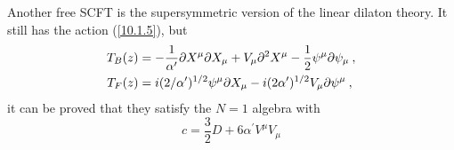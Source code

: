 Another free SCFT is the supersymmetric version of the linear dilaton theory. It still has the action (\ref{10.1.5}), but
\begin{subequations}
	\begin{align}
		T_{B}(z)&=-\frac{1}{\alpha^{\prime}} \partial X^{\mu}\partial X_{\mu} +V_{\mu}\partial^{2}X^{\mu} -\frac{1}{2}\psi^{\mu}\partial\psi_{\mu} \:,\label{10.1.22a} \\
		T_{F}(z)&= i(2/\alpha^{\prime})^{1/2}\psi^{\mu}\partial X_{\mu}-i (2\alpha^{\prime})^{1/2}V_{\mu}\partial\psi^{\mu} \:, \label{10.1.22b} 
	\end{align} \label{10.1.22}
\end{subequations}
it can be proved that they satisfy the $N=1$ algebra with
\begin{equation}
	c=\frac{3}{2}D+6\alpha^{\prime} V^{\mu}V_{\mu}  \label{10.1.23}
\end{equation}
